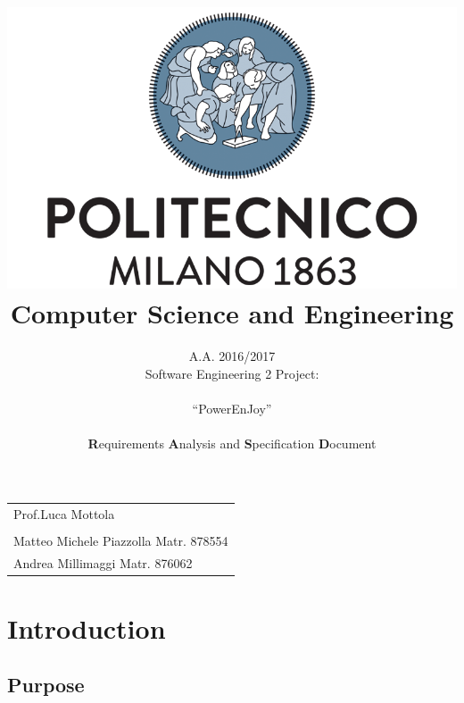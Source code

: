 \documentclass[english]{article}
\newcommand{\lyxrightaddress}[1]{
\par {\raggedleft \begin{tabular}{l}\ignorespaces
#1
\end{tabular}
\vspace{1.4em}
\par}
}
\begin{document}
\title{\includegraphics[scale=0.4]{img/polimi}\\
Computer Science and Engineering}

\begin{doublespace}

\author{A.A. 2016/2017\\
Software Engineering 2 Project: \\
\\
{\LARGE{}``PowerEnJoy''}\textbf{}\\
\\
\textbf{R}equirements \textbf{A}nalysis and \textbf{S}pecification
\textbf{D}ocument\\
}
\end{doublespace}

\maketitle

\lyxrightaddress{Prof.Luca Mottola\\
\\
Matteo Michele Piazzolla Matr. 878554\\
Andrea Millimaggi Matr. 876062}

\newpage{}
\listoftodos
\newpage{}

\tableofcontents{}

\newpage{}


\section{Introduction}


\subsection{Purpose}
\end{document}
